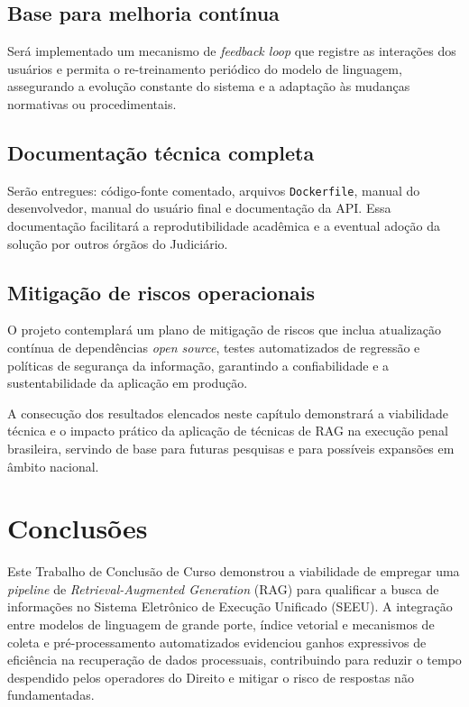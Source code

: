 \begin{description}
\section{Base para melhoria contínua}
Será implementado um mecanismo de \emph{feedback loop} que registre as interações dos usuários e permita o re-treinamento periódico do modelo de linguagem, assegurando a evolução constante do sistema e a adaptação às mudanças normativas ou procedimentais.

\section{Documentação técnica completa}
Serão entregues: código-fonte comentado, arquivos \texttt{Dockerfile}, manual do desenvolvedor, manual do usuário final e documentação da API. Essa documentação facilitará a reprodutibilidade acadêmica e a eventual adoção da solução por outros órgãos do Judiciário.

\section{Mitigação de riscos operacionais}
O projeto contemplará um plano de mitigação de riscos que inclua atualização contínua de dependências \emph{open source}, testes automatizados de regressão e políticas de segurança da informação, garantindo a confiabilidade e a sustentabilidade da aplicação em produção.

A consecução dos resultados elencados neste capítulo demonstrará a viabilidade técnica e o impacto prático da aplicação de técnicas de RAG na execução penal brasileira, servindo de base para futuras pesquisas e para possíveis expansões em âmbito nacional.


\chapter{Conclusões}
\label{chap:conclusoes}

Este Trabalho de Conclusão de Curso demonstrou a viabilidade de empregar uma \textit{pipeline} de \textit{Retrieval-Augmented Generation} (RAG) para qualificar a busca de informações no Sistema Eletrônico de Execução Unificado (SEEU). A integração entre modelos de linguagem de grande porte, índice vetorial e mecanismos de coleta e pré-processamento automatizados evidenciou ganhos expressivos de eficiência na recuperação de dados processuais, contribuindo para reduzir o tempo despendido pelos operadores do Direito e mitigar o risco de respostas não fundamentadas.


\end{description}

